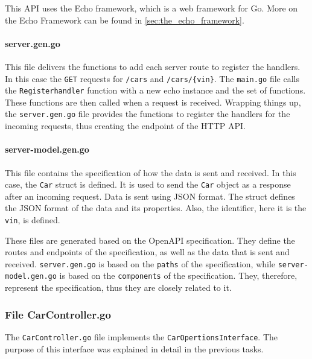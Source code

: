 This API uses the Echo framework, which is a web framework for Go.
More on the Echo Framework can be found in \autoref*{sec:the_echo_framework}.

\paragraph*{server.gen.go}
This file delivers the functions to add each server route to register the handlers.
In this case the \texttt{GET} requests for \texttt{/cars} and \texttt{/cars/\{vin\}}.
The \texttt{main.go} file calls the \texttt{Registerhandler} function with a new echo instance and the set of functions.
These functions are then called when a request is received.
Wrapping things up, the \texttt{server.gen.go} file provides the functions to register the handlers for the incoming requests, thus creating the endpoint of the HTTP API.

\paragraph*{server-model.gen.go}
This file contains the specification of how the data is sent and received.
In this case, the \texttt{Car} struct is defined.
It is used to send the \texttt{Car} object as a response after an incoming request.
Data is sent using JSON format.
The struct defines the JSON format of the data and its properties.
Also, the identifier, here it is the \texttt{vin}, is defined.

These files are generated based on the OpenAPI specification.
They define the routes and endpoints of the specification, as well as the data that is sent and received.
\texttt{server.gen.go} is based on the \texttt{paths} of the specification, while \texttt{server-model.gen.go} is based on the \texttt{components} of the specification.
They, therefore, represent the specification, thus they are closely related to it.

\subsubsection*{File CarController.go}
The \texttt{CarController.go} file implements the \texttt{CarOpertionsInterface}.
The purpose of this interface was explained in detail in the previous tasks.

